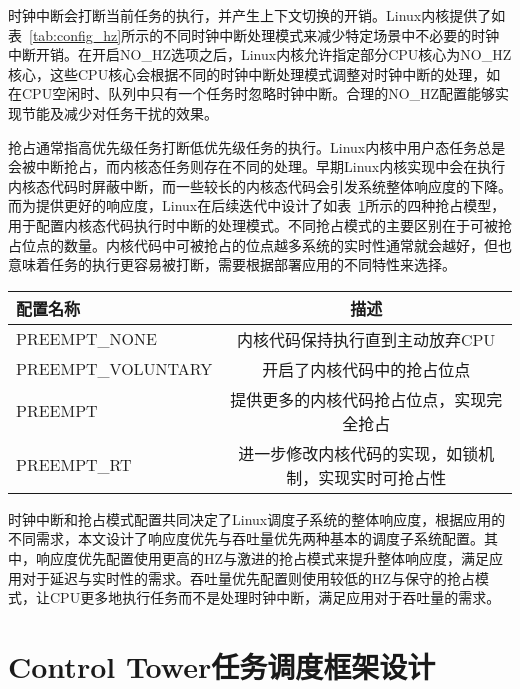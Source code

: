 时钟中断会打断当前任务的执行，并产生上下文切换的开销。Linux内核提供了如表~\ref{tab:config_hz}所示的不同时钟中断处理模式来减少特定场景中不必要的时钟中断开销。在开启NO\_HZ选项之后，Linux内核允许指定部分CPU核心为NO\_HZ核心，这些CPU核心会根据不同的时钟中断处理模式调整对时钟中断的处理，如在CPU空闲时、队列中只有一个任务时忽略时钟中断。合理的NO\_HZ配置能够实现节能及减少对任务干扰的效果。

抢占通常指高优先级任务打断低优先级任务的执行。Linux内核中用户态任务总是会被中断抢占，而内核态任务则存在不同的处理。早期Linux内核实现中会在执行内核态代码时屏蔽中断，而一些较长的内核态代码会引发系统整体响应度的下降。而为提供更好的响应度，Linux在后续迭代中设计了如表~\ref{tab:config_preempt}所示的四种抢占模型，用于配置内核态代码执行时中断的处理模式。不同抢占模式的主要区别在于可被抢占位点的数量。内核代码中可被抢占的位点越多系统的实时性通常就会越好，但也意味着任务的执行更容易被打断，需要根据部署应用的不同特性来选择。

\begin{table}
    \label{tab:config_preempt}
    \footnotesize%
    \setlength{\tabcolsep}{4pt}%
    \renewcommand{\arraystretch}{1.25}%
    \centering
    \begin{tabular}{lc}
        \hline
        配置名称 & 描述 \\
        \hline
        PREEMPT\_NONE  & 内核代码保持执行直到主动放弃CPU  \\
        PREEMPT\_VOLUNTARY  & 开启了内核代码中的抢占位点 \\
        PREEMPT  & 提供更多的内核代码抢占位点，实现完全抢占 \\
        PREEMPT\_RT & 进一步修改内核代码的实现，如锁机制，实现实时可抢占性 \\
        \hline
    \end{tabular}
\end{table}

时钟中断和抢占模式配置共同决定了Linux调度子系统的整体响应度，根据应用的不同需求，本文设计了响应度优先与吞吐量优先两种基本的调度子系统配置。其中，响应度优先配置使用更高的HZ与激进的抢占模式来提升整体响应度，满足应用对于延迟与实时性的需求。吞吐量优先配置则使用较低的HZ与保守的抢占模式，让CPU更多地执行任务而不是处理时钟中断，满足应用对于吞吐量的需求。

\section{Control Tower任务调度框架设计}

